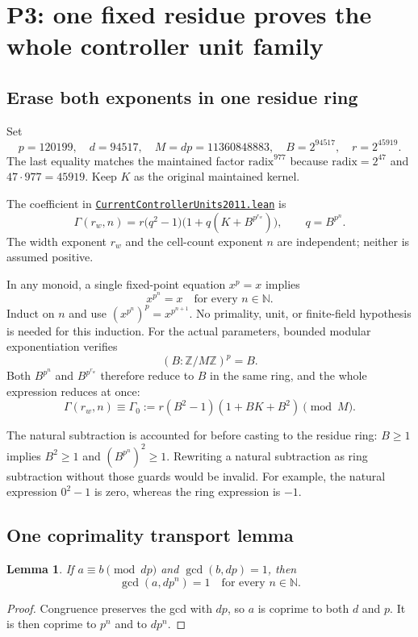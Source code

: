 \documentclass[11pt,letterpaper]{article}
\newtheorem{lemma}[theorem]{Lemma}
\newcommand{\N}{\mathbb N}
\newcommand{\Z}{\mathbb Z}
\newcommand{\Zm}[1]{\Z/#1\Z}
\newcommand{\repobase}{https://github.com/VladimirReshetnikov/ProveIt/blob/9f35798db4a63c25e435fca14d75931144657d7e}
\newcommand{\leanfile}[1]{\href{\repobase/Computability/DiophantineConsistency/Lean/DiophantineConsistency/#1.lean}{\nolinkurl{#1.lean}}}
\begin{document}
\section{P3: one fixed residue proves the whole controller unit family}

\subsection{Erase both exponents in one residue ring}

Set
\[
 p=120199,\quad d=94517,\quad M=dp=11360848883,\quad
 B=2^{94517},\quad r=2^{45919}.
\]
The last equality matches the maintained factor
$\mathrm{radix}^{977}$ because $\mathrm{radix}=2^{47}$ and
$47\cdot977=45919$. Keep $K$ as the original maintained kernel.

The coefficient in \leanfile{CurrentControllerUnits2011} is
\[
 \Gamma(r_w,n)=r\bigl(q^2-1\bigr)
       \bigl(1+q(K+B^{p^{r_w}})\bigr),\qquad q=B^{p^n}.
\]
The width exponent $r_w$ and the cell-count exponent $n$ are independent;
neither is assumed positive.

In any monoid, a single fixed-point equation $x^p=x$ implies
\[
 x^{p^n}=x\quad\text{for every }n\in\N.
\]
Induct on $n$ and use $(x^{p^n})^p=x^{p^{n+1}}$. No primality, unit,
or finite-field hypothesis is needed for this induction. For the actual
parameters, bounded modular exponentiation verifies
\[
 (B:\Zm M)^p=B.
\]
Both $B^{p^n}$ and $B^{p^{r_w}}$ therefore reduce to $B$ in the same ring,
and the whole expression reduces at once:
\begin{equation}
 \Gamma(r_w,n)\equiv
 \Gamma_0:=r(B^2-1)(1+BK+B^2)\pmod M.
 \label{eq:gamma}
\end{equation}

The natural subtraction is accounted for before casting to the residue
ring: $B\ge1$ implies $B^2\ge1$ and $(B^{p^n})^2\ge1$. Rewriting a
natural subtraction as ring subtraction without those guards would be
invalid. For example, the natural expression $0^2-1$ is zero, whereas the
ring expression is $-1$.

\subsection{One coprimality transport lemma}

\begin{lemma}
If $a\equiv b\pmod{dp}$ and $\gcd(b,dp)=1$, then
\[
 \gcd(a,dp^n)=1\quad\text{for every }n\in\N.
\]
\end{lemma}
\begin{proof}
Congruence preserves the gcd with $dp$, so $a$ is coprime to both $d$ and
$p$. It is then coprime to $p^n$ and to $dp^n$.
\end{proof}
\end{document}
